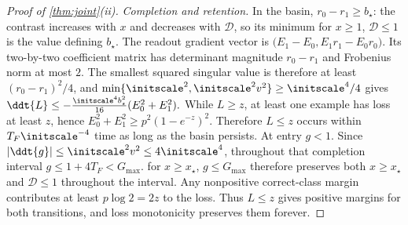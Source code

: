 \begin{proof}[Proof of \cref{thm:joint}(ii)]
\emph{Completion and retention.}
In the basin, $r_0-r_1\ge b_\star$: the contrast increases with $x$ and decreases with $\mathcal D$, so its minimum for $x\ge1$, $\mathcal D\le1$
is the value defining $b_\star$. The readout gradient vector is
$\bigl(E_1-E_0,E_1r_1-E_0r_0\bigr)$.
Its two-by-two coefficient matrix has determinant magnitude $r_0-r_1$ and Frobenius norm at most $2$.
The smallest squared singular value is therefore at least $(r_0-r_1)^2/4$, and
$\min\{\initscale^2,\initscale^2v^2\}\ge\initscale^4/4$ gives
 $\ddt{L}\le-\frac{\initscale^4b_\star^2}{16}(E_0^2+E_1^2).$ 
While $L\ge z$, at least one example has loss at least $z$, hence
$E_0^2+E_1^2\ge p^2(1-e^{-z})^2$. Therefore $L\le z$ occurs within $T_F\initscale^{-4}$ time as long as the basin persists.
At entry $g<1$. Since $|\ddt{g}|\le\initscale^2v^2\le4\initscale^4$, throughout that completion interval
$g\le1+4T_F<G_{\max}$.  for $x\ge x_\star$, $g\le G_{\max}$ therefore preserves both $x\ge x_\star$ and $\mathcal D\le1$ throughout the interval.
Any nonpositive correct-class margin contributes at least $p\log2=2z$ to the loss. Thus $L\le z$ gives positive margins for both transitions, and loss monotonicity preserves them forever.
\end{proof}


